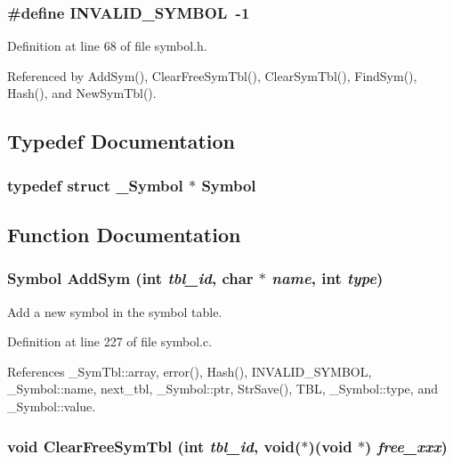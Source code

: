 \subsubsection{\setlength{\rightskip}{0pt plus 5cm}\#define INVALID\_\-SYMBOL~-1}\label{symbol_8h_012b83e588ff7bc4c8c35e18af47609e}




Definition at line 68 of file symbol.h.

Referenced by Add\-Sym(), Clear\-Free\-Sym\-Tbl(), Clear\-Sym\-Tbl(), Find\-Sym(), Hash(), and New\-Sym\-Tbl().

\subsection{Typedef Documentation}
\subsubsection{\setlength{\rightskip}{0pt plus 5cm}typedef struct \bf{\_\-Symbol} $\ast$ \bf{Symbol}}\label{symbol_8h_428b746beb7673abd526ae4523905a32}




\subsection{Function Documentation}
\subsubsection{\setlength{\rightskip}{0pt plus 5cm}\bf{Symbol} Add\-Sym (int {\em tbl\_\-id}, char $\ast$ {\em name}, int {\em type})}\label{symbol_8h_05f93640438901f9a61dbd26d507fd7c}


Add a new symbol in the symbol table. 

Definition at line 227 of file symbol.c.

References \_\-Sym\-Tbl::array, error(), Hash(), INVALID\_\-SYMBOL, \_\-Symbol::name, next\_\-tbl, \_\-Symbol::ptr, Str\-Save(), TBL, \_\-Symbol::type, and \_\-Symbol::value.
\subsubsection{\setlength{\rightskip}{0pt plus 5cm}void Clear\-Free\-Sym\-Tbl (int {\em tbl\_\-id}, void($\ast$)(void $\ast$) {\em free\_\-xxx})}\label{symbol_8h_f622da4f3a37bf4e093a755acb5c3895}




